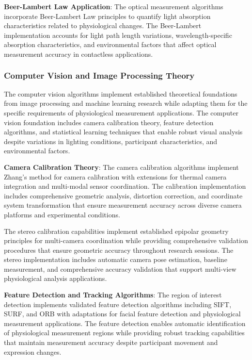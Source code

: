 \documentclass[11pt,a4paper]{article}
\begin{document}
\textbf{Beer-Lambert Law Application}: The optical measurement algorithms incorporate Beer-Lambert Law principles to quantify
light absorption characteristics related to physiological changes. The Beer-Lambert implementation accounts for light
path length variations, wavelength-specific absorption characteristics, and environmental factors that affect optical
measurement accuracy in contactless applications.

\subsubsection{Computer Vision and Image Processing Theory}

The computer vision algorithms implement established theoretical foundations from image processing and machine learning
research while adapting them for the specific requirements of physiological measurement applications. The computer
vision foundation includes camera calibration theory, feature detection algorithms, and statistical learning techniques
that enable robust visual analysis despite variations in lighting conditions, participant characteristics, and
environmental factors.

\textbf{Camera Calibration Theory}: The camera calibration algorithms implement Zhang's method for camera calibration with
extensions for thermal camera integration and multi-modal sensor coordination. The calibration implementation includes
comprehensive geometric analysis, distortion correction, and coordinate system transformation that ensure measurement
accuracy across diverse camera platforms and experimental conditions.

The stereo calibration capabilities implement established epipolar geometry principles for multi-camera coordination
while providing comprehensive validation procedures that ensure geometric accuracy throughout research sessions. The
stereo implementation includes automatic camera pose estimation, baseline measurement, and comprehensive accuracy
validation that support multi-view physiological analysis applications.

\textbf{Feature Detection and Tracking Algorithms}: The region of interest detection implements validated feature detection
algorithms including SIFT, SURF, and ORB with adaptations for facial feature detection and physiological measurement
applications. The feature detection enables automatic identification of physiological measurement regions while
providing robust tracking capabilities that maintain measurement accuracy despite participant movement and expression
changes.
\end{document}
